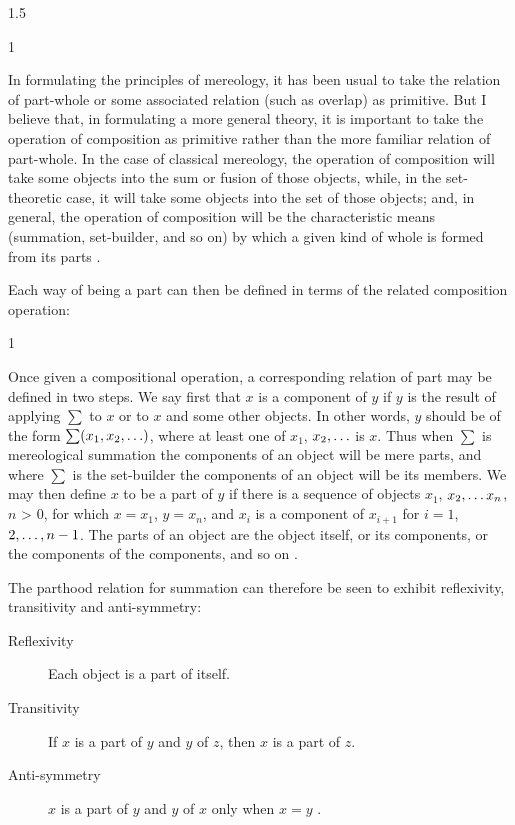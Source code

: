 \documentclass[11pt]{article}
\newenvironment{squote}{%
\begin{spacing}{1}
\begin{list}{}{%
\setlength{\labelwidth}{0pt}%
\rightmargin\leftmargin%
}
\item\relax
}{%
\end{list}%
\end{spacing}
}
\begin{document}
\begin{spacing}{1.5}
\begin{squote}
In formulating the principles of mereology, it has been usual to take
the relation of part-whole or some associated relation (such as
overlap) as primitive.  But I believe that, in formulating a more
general theory, it is important to take the operation of composition
as primitive rather than the more familiar relation of part-whole.  In
the case of classical mereology, the operation of composition will
take some objects into the sum or fusion of those objects, while, in
the set-theoretic case, it will take some objects into the set of
those objects; and, in general, the operation of composition will be
the characteristic means (summation, set-builder, and so on) by which
a given kind of whole is formed from its parts \citep[565]{fine2010}.
\end{squote}

Each way of being a part can then be defined in terms of the related
composition operation:

\begin{squote}
Once given a compositional operation, a corresponding relation of part
may be defined in two steps.  We say first that $x$ is a component of
$y$ if $y$ is the result of applying $\sum$ to $x$ or to $x$ and some
other objects.  In other words, $y$ should be of the form $\sum
(x_{1}, x_{2}, \mathellipsis )$, where at least one of $x_1$, $x_2,
\mathellipsis$ is $x$.  Thus when $\sum$ is mereological summation the
components of an object will be mere parts, and where $\sum$ is the
set-builder the components of an object will be its members.  We may
then define $x$ to be a part of $y$ if there is a sequence of objects
$x_1$, $x_2, \mathellipsis x_n$, $n$ \textgreater{} $0$, for which $x
= x_1$, $y = x_n$, and $x_i$ is a component of $x_{i+1}$ for $i = 1$,
$2, \mathellipsis, n-1$. The parts of an object are the object itself,
or its components, or the components of the components, and so on
\citep[567--568]{fine2010}.
\end{squote}

The parthood relation for summation can therefore be seen to exhibit
reflexivity, transitivity and anti-symmetry:

\begin{description}
\item[Reflexivity] Each object is a part of itself.
\item[Transitivity] If $x$ is a part of $y$ and $y$ of $z$, then $x$
  is a part of $z$.
\item[Anti-symmetry] $x$ is a part of $y$ and $y$ of $x$ only when $x
  = y$ \citep[568]{fine2010}.
\end{description}


\end{spacing}
\end{document}
